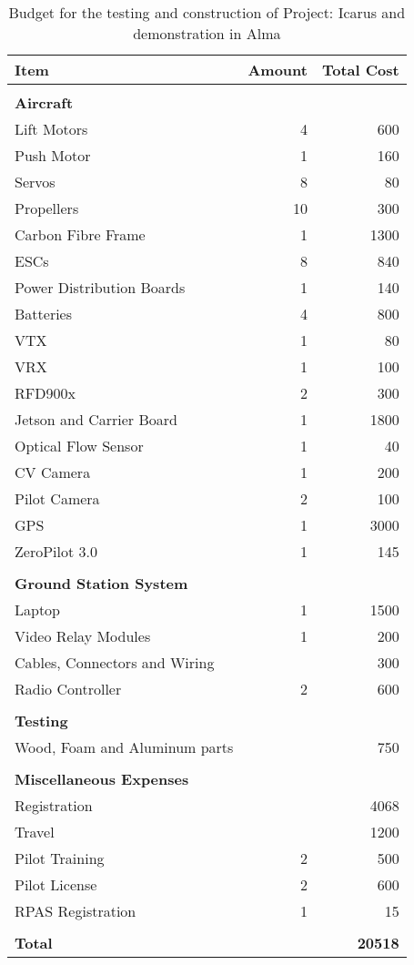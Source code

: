 \begin{table}[h]
\centering
\begin{tabular}{lrr}
\color{hyperrideblue} \textbf{Item} &
\color{hyperrideblue} \textbf{Amount} &
\color{hyperrideblue} \textbf{Total Cost} \\ \midrule
& & \\
\color{hyperrideblue} \textbf{Aircraft} &  &  \\ \midrule
Lift Motors & 4 & 600 \\
Push Motor & 1 & 160 \\
Servos & 8 & 80 \\
Propellers & 10 & 300 \\
Carbon Fibre Frame & 1 & 1300 \\
ESCs & 8 & 840 \\
Power Distribution Boards & 1 & 140 \\
Batteries & 4 & 800 \\
VTX & 1 & 80 \\
VRX & 1 & 100 \\
RFD900x & 2 & 300 \\
Jetson and Carrier Board & 1 & 1800 \\
Optical Flow Sensor & 1 & 40 \\
CV Camera & 1 & 200 \\
Pilot Camera & 2 & 100 \\
GPS & 1 & 3000 \\
ZeroPilot 3.0 & 1 & 145 \\
& & \\
\color{hyperrideblue} \textbf{Ground Station System} &  &  \\ \midrule
Laptop & 1 & 1500 \\
Video Relay Modules & 1 & 200 \\
Cables, Connectors and Wiring &  & 300 \\
Radio Controller & 2 & 600 \\
& & \\
\color{hyperrideblue} \textbf{Testing} &  &  \\ \midrule
Wood, Foam and Aluminum parts &  & 750 \\
& & \\
\color{hyperrideblue} \textbf{Miscellaneous Expenses} &  &  \\ \midrule
Registration & & 4068 \\
Travel &  & 1200 \\
Pilot Training & 2 & 500 \\
Pilot License & 2 & 600 \\
RPAS Registration & 1 & 15 \\
& & \\ \midrule
\color{hyperrideblue} \textbf{Total} & \textbf{} & \textbf{20518}
\end{tabular}
\caption{Budget for the testing and construction of Project: Icarus and demonstration in
Alma}
\end{table}

\clearpage
